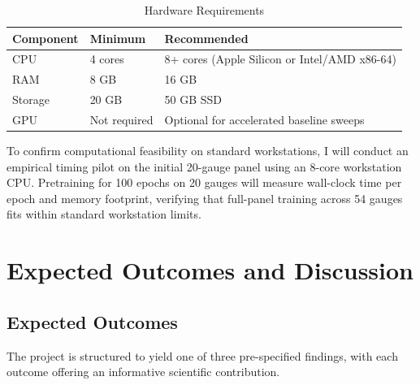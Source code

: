 \documentclass[12pt]{report}
\begin{document}
\begin{table}[h]
  \caption{Hardware Requirements}
  \label{tab:hardware}
  \centering
  \begin{tabular}{|l|l|l|}
    \hline
    \textbf{Component} & \textbf{Minimum} & \textbf{Recommended} \\
    \hline
    CPU & 4 cores & 8+ cores (Apple Silicon or Intel/AMD x86-64) \\
    \hline
    RAM & 8 GB & 16 GB \\
    \hline
    Storage & 20 GB & 50 GB SSD \\
    \hline
    GPU & Not required & Optional for accelerated baseline sweeps \\
    \hline
  \end{tabular}
\end{table}

To confirm computational feasibility on standard workstations, I will conduct an empirical timing pilot on the initial 20-gauge panel using an 8-core workstation CPU. Pretraining for 100 epochs on 20 gauges will measure wall-clock time per epoch and memory footprint, verifying that full-panel training across 54 gauges fits within standard workstation limits.


\chapter{Expected Outcomes and Discussion}

\section{Expected Outcomes}

The project is structured to yield one of three pre-specified findings, with each outcome offering an informative scientific contribution.
\end{document}
